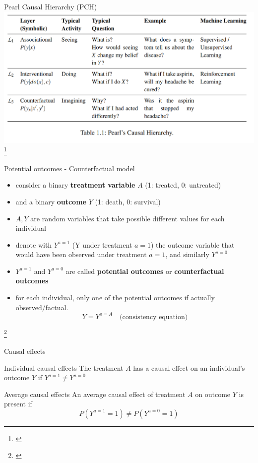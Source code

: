 \documentclass{beamer}
\newcommand\blfootnote[1]{%
  \begingroup
  \renewcommand\thefootnote{}\footnote{#1}%
  \addtocounter{footnote}{-1}%
  \endgroup
}
\begin{document}
\begin{frame}{Pearl Causal Hierarchy (PCH)}
	\includegraphics[scale=0.3]{images/PCH} 
	\blfootnote{\citet{bareinboim2022pearl}}
\end{frame}

\begin{frame}{Potential outcomes - Counterfactual model}
	\begin{itemize}
		\item consider a binary \textbf{treatment variable} $A$ (1: treated, 0: untreated)    
		\item and a binary \textbf{outcome} $Y$ (1: death, 0: survival) 
		\item $A,Y$ are random variables that take possible different values for each individual
		\item<2-> denote with $Y^{a=1}$ (Y under treatment $a=1$) the outcome variable that would have been observed under treatment $a=1$, and similarly $Y^{a=0}$ 
		\item<2-> $Y^{a=1}$ and $Y^{a=0}$ are called \textbf{potential outcomes} or \textbf{counterfactual outcomes} 
		\item<3-> for each individual, only one of the potential outcomes 
			if actually observed/factual. 
			\[ Y = Y^{a=A}  \quad \text{(consistency equation)} \]
	\end{itemize}
	\blfootnote{\citet{whatif, wasserman2004all}}

\end{frame}

\begin{frame}{Causal effects}
	\begin{definition}{Individual causal effects}
The treatment $A$ has a causal effect on an individual's outcome $Y$ if $Y^{a=1} \neq Y^{a=0}$ 
	\end{definition}

	\begin{definition}{Average causal effects}
		An average causal effect of treatment $A$ on outcome $Y$ is present if 
		\[ P(Y^{a=1} = 1) \neq   P(Y^{a=0} = 1) \]
	\end{definition}
\end{frame}
\end{document}
